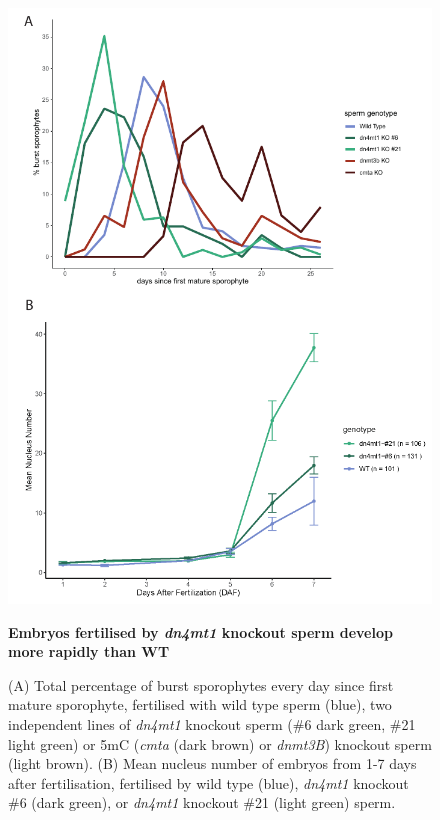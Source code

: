 \begin{figure}[htbp!] 
\centering    
    \includegraphics[width=1\textwidth]{Chapter3/Figs/Figure6_burstpeak_nuclei_number.pdf}
\caption{\textbf{Embryos fertilised by \textit{dn4mt1} knockout sperm develop more rapidly than WT}}
\label{fig:burstpeak}
\captionsetup{font=small}
    \caption*{(A) Total percentage of burst sporophytes every day since first mature sporophyte, fertilised with wild type sperm (blue), two independent lines of \textit{dn4mt1} knockout sperm (\#6 dark green, \#21 light green) or 5mC (\textit{cmta} (dark brown) or \textit{dnmt3B}) knockout sperm (light brown). (B) Mean nucleus number of embryos from 1-7 days after fertilisation, fertilised by wild type (blue), \textit{dn4mt1} knockout \#6 (dark green), or \textit{dn4mt1} knockout \#21 (light green) sperm. }
\end{figure}

